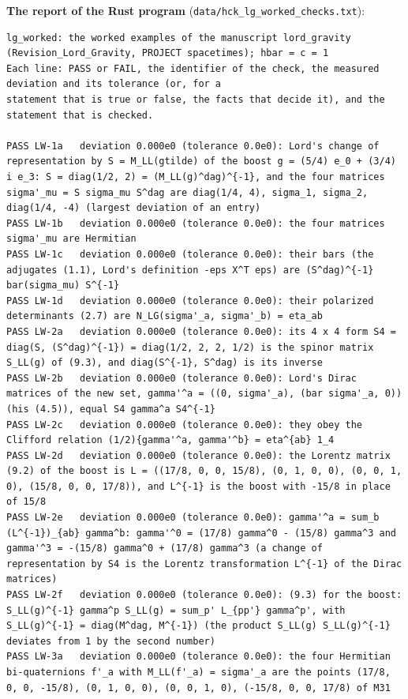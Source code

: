 \documentclass[
  10pt,
]{article}
\begin{document}
\textbf{The report of the Rust program}
(\texttt{data/hck\_lg\_worked\_checks.txt}):

\begin{verbatim}
lg_worked: the worked examples of the manuscript lord_gravity (Revision_Lord_Gravity, PROJECT spacetimes); hbar = c = 1
Each line: PASS or FAIL, the identifier of the check, the measured deviation and its tolerance (or, for a
statement that is true or false, the facts that decide it), and the statement that is checked.

PASS LW-1a   deviation 0.000e0 (tolerance 0.0e0): Lord's change of representation by S = M_LL(gtilde) of the boost g = (5/4) e_0 + (3/4) i e_3: S = diag(1/2, 2) = (M_LL(g)^dag)^{-1}, and the four matrices sigma'_mu = S sigma_mu S^dag are diag(1/4, 4), sigma_1, sigma_2, diag(1/4, -4) (largest deviation of an entry)
PASS LW-1b   deviation 0.000e0 (tolerance 0.0e0): the four matrices sigma'_mu are Hermitian
PASS LW-1c   deviation 0.000e0 (tolerance 0.0e0): their bars (the adjugates (1.1), Lord's definition -eps X^T eps) are (S^dag)^{-1} bar(sigma_mu) S^{-1}
PASS LW-1d   deviation 0.000e0 (tolerance 0.0e0): their polarized determinants (2.7) are N_LG(sigma'_a, sigma'_b) = eta_ab
PASS LW-2a   deviation 0.000e0 (tolerance 0.0e0): its 4 x 4 form S4 = diag(S, (S^dag)^{-1}) = diag(1/2, 2, 2, 1/2) is the spinor matrix S_LL(g) of (9.3), and diag(S^{-1}, S^dag) is its inverse
PASS LW-2b   deviation 0.000e0 (tolerance 0.0e0): Lord's Dirac matrices of the new set, gamma'^a = ((0, sigma'_a), (bar sigma'_a, 0)) (his (4.5)), equal S4 gamma^a S4^{-1}
PASS LW-2c   deviation 0.000e0 (tolerance 0.0e0): they obey the Clifford relation (1/2){gamma'^a, gamma'^b} = eta^{ab} 1_4
PASS LW-2d   deviation 0.000e0 (tolerance 0.0e0): the Lorentz matrix (9.2) of the boost is L = ((17/8, 0, 0, 15/8), (0, 1, 0, 0), (0, 0, 1, 0), (15/8, 0, 0, 17/8)), and L^{-1} is the boost with -15/8 in place of 15/8
PASS LW-2e   deviation 0.000e0 (tolerance 0.0e0): gamma'^a = sum_b (L^{-1})_{ab} gamma^b: gamma'^0 = (17/8) gamma^0 - (15/8) gamma^3 and gamma'^3 = -(15/8) gamma^0 + (17/8) gamma^3 (a change of representation by S4 is the Lorentz transformation L^{-1} of the Dirac matrices)
PASS LW-2f   deviation 0.000e0 (tolerance 0.0e0): (9.3) for the boost: S_LL(g)^{-1} gamma^p S_LL(g) = sum_p' L_{pp'} gamma^p', with S_LL(g)^{-1} = diag(M^dag, M^{-1}) (the product S_LL(g) S_LL(g)^{-1} deviates from 1 by the second number)
PASS LW-3a   deviation 0.000e0 (tolerance 0.0e0): the four Hermitian bi-quaternions f'_a with M_LL(f'_a) = sigma'_a are the points (17/8, 0, 0, -15/8), (0, 1, 0, 0), (0, 0, 1, 0), (-15/8, 0, 0, 17/8) of M31

\end{verbatim}
\end{document}
